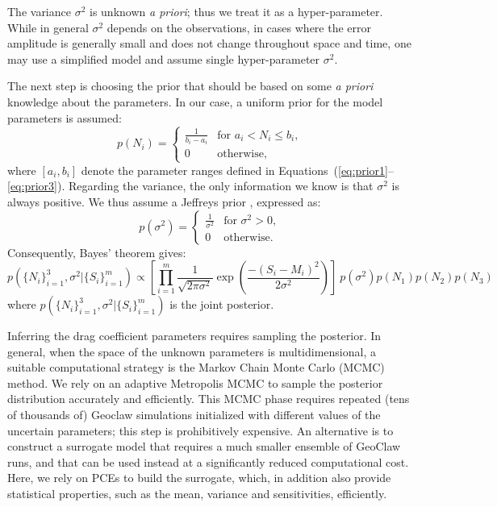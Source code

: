 The variance $\sigma^2$ is unknown \emph{a priori}; thus we treat it as a hyper-parameter.
While in general $\sigma^2$ depends on the observations, in cases where the error
amplitude is generally small and does not change throughout space and time, one may use
a simplified model and assume single hyper-parameter $\sigma^2$.

The next step is choosing the prior that should be based 
on some \emph{a priori} knowledge about the parameters. In our case, a uniform
prior for the model parameters is assumed:
\begin{equation} 
p(N_i) = \begin{cases}
		\displaystyle \frac{1}{b_i-a_i} &\text{for~} a_i <  N_i \leq b_i ,  \\
		0 &\text{otherwise}  , 
\end{cases}
\end{equation}
where $ [a_i,b_i]$ denote the parameter ranges defined in 
Equations~(\ref{eq:prior1}--\ref{eq:prior3}).
Regarding the variance, the only information we know 
is that $\sigma^2$ is always positive.
We thus assume a Jeffreys prior \citep{sivia}, expressed as:
\begin{equation} 
p(\sigma^2) =  \begin{cases}
		\displaystyle \frac{1}{\sigma^2} &\text{for~} \sigma^2 > 0,  \\
		0 &\text{otherwise}. 
		\end{cases}
\label{eq:var_pr}
\end{equation}
Consequently, Bayes' theorem gives:
\begin{equation} 
p(\{N_i\}_{i=1}^3,\sigma^2 | \{S_i\}_{i=1}^m) 
\propto
\left[ \prod_{i=1}^m  \frac{1}{\sqrt{2 \pi \sigma^2}} 
\exp \left( \frac{-(S_i - M_i)^2}{2 \sigma^2} \right) \right] 
\ p(\sigma^2)p(N_1)p(N_2) p(N_3)
\end{equation}
where $p(\{N_i\}_{i=1}^3,\sigma^2 | \{S_i\}_{i=1}^m)$  is the joint posterior.

Inferring the drag coefficient parameters requires 
sampling the posterior. In general, when the space of the unknown 
parameters is multidimensional, a suitable computational strategy is 
the Markov Chain Monte  Carlo (MCMC) method. 
We rely on an adaptive Metropolis MCMC \citep{Gareth2009,Haario2001} to
sample the posterior distribution accurately and efficiently.
This MCMC phase requires repeated (tens of
thousands of) Geoclaw simulations initialized with different values of the
uncertain parameters; this step is prohibitively expensive. An
alternative is to construct a surrogate model that requires a much
smaller ensemble of GeoClaw runs, and that can be used instead
at a significantly reduced computational cost.  Here, we rely on
PCEs to build the surrogate, which, in addition
also provide statistical properties,  such as the mean, variance and sensitivities,
efficiently.